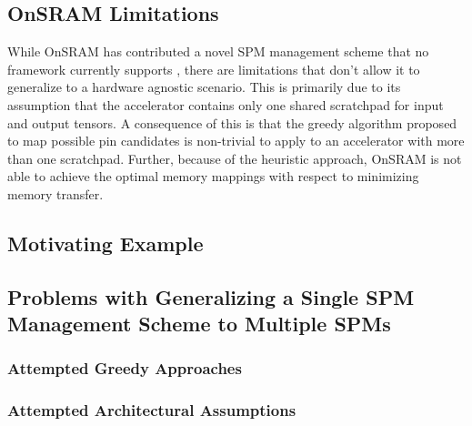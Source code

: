 
\subsection{OnSRAM Limitations}

While OnSRAM has contributed a novel SPM management scheme that no framework
currently supports \cite{onsram}, there are limitations that don't allow it to
generalize to a hardware agnostic scenario. This is primarily due to its
assumption that the accelerator contains only one shared scratchpad for input
and output tensors. A consequence of this is that the greedy algorithm proposed
to map possible pin candidates is non-trivial to apply to an accelerator with
more than one scratchpad. Further, because of the heuristic approach, OnSRAM is not able
to achieve the optimal memory mappings with respect to minimizing memory transfer.


\subsection{Motivating Example}


\subsection{Problems with Generalizing a Single SPM Management Scheme to Multiple SPMs}
\subsubsection{Attempted Greedy Approaches}
\subsubsection{Attempted Architectural Assumptions}
